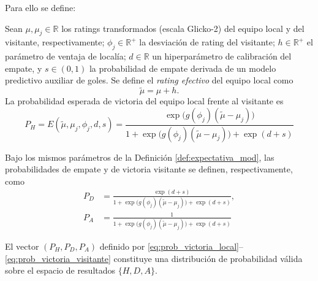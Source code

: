 Para ello se define:

\begin{definition}
	\label{def:expectativa_mod}
	Sean $\mu, \mu_j \in \mathbb{R}$ los ratings transformados (escala Glicko-2) del equipo local y del visitante, respectivamente; $\phi_j \in \mathbb{R}^+$ la desviaci\'on de rating del visitante; $h \in \mathbb{R}^+$ el par\'ametro de ventaja de local\'ia; $d \in \mathbb{R}$ un hiperpar\'ametro de calibraci\'on del empate, y $s \in (0,1)$ la probabilidad de empate derivada de un modelo predictivo auxiliar de goles. Se define el \emph{rating efectivo} del equipo local como
	\begin{equation}
		\label{eq:rating_efectivo}
		\tilde{\mu} = \mu + h.
	\end{equation}
	La probabilidad esperada de victoria del equipo local frente al visitante es
	\begin{equation}
		\label{eq:prob_victoria_local}
			P_H = E(\tilde{\mu}, \mu_j, \phi_j, d, s) = \frac{\exp\bigl(g(\phi_j)(\tilde{\mu} - \mu_j)\bigr)}{1 + \exp\bigl(g(\phi_j)(\tilde{\mu} - \mu_j)\bigr) + \exp(d+s)}
	\end{equation}
\end{definition}

\begin{definition}
	\label{def:prob_resultado}
	Bajo los mismos par\'ametros de la Definici\'on \ref{def:expectativa_mod}, las probabilidades de empate y de victoria visitante se definen, respectivamente, como
	\begin{align}
		\label{eq:prob_empate}
		P_D &= \frac{\exp(d+s)}{1 + \exp\bigl(g(\phi_j)(\tilde{\mu} - \mu_j)\bigr) + \exp(d+s)}, \\
		\label{eq:prob_victoria_visitante}
		P_A &= \frac{1}{1 + \exp\bigl(g(\phi_j)(\tilde{\mu} - \mu_j)\bigr) + \exp(d+s)}
	\end{align}
\end{definition}

\begin{prop}
	\label{prop:suma_unitaria_shelopugin}
	El vector $(P_H, P_D, P_A)$ definido por \eqref{eq:prob_victoria_local}--\eqref{eq:prob_victoria_visitante} constituye una distribuci\'on de probabilidad v\'alida sobre el espacio de resultados $\{H, D, A\}$.
\end{prop}

